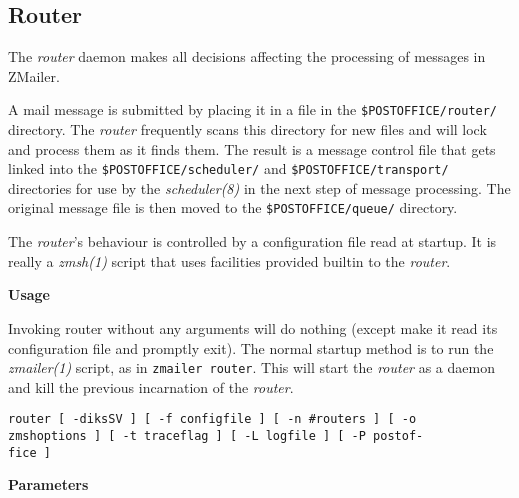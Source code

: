 \subsection{Router}

The {\em router\/} daemon makes all decisions affecting 
the processing of messages in ZMailer.

A mail message is submitted by placing it in a file in the
{\tt \$POSTOFFICE/router/} directory. The 
{\em router\/} frequently scans this directory for new 
files and will lock and process them as it finds them. 
The result is a message control file that gets linked into 
the {\tt \$POSTOFFICE/scheduler/} and 
{\tt \$POSTOFFICE/transport/} directories for use 
by the {\em scheduler(8)\/} in the next step of message 
processing. The original message file is then moved to the 
{\tt \$POSTOFFICE/queue/} directory. 

The {\em router\/}'s behaviour is controlled by a 
configuration file read at startup. It is really a 
{\em zmsh(1)\/} script that uses facilities provided 
builtin to the {\em router\/}. 

{\bf Usage}

Invoking router without any arguments will do nothing
(except make it read its configuration file and promptly
exit). The normal startup method is to run the {\em zmailer(1)\/} 
script, as in {\tt zmailer router}. This will start the 
{\em router\/} as a daemon and  kill the previous 
incarnation of the {\em router\/}. 

\begin{tscreen}
\begin{verbatim}
router [ -diksSV ] [ -f configfile ] [ -n #routers ] [ -o 
zmshoptions ] [ -t traceflag ] [ -L logfile ] [ -P postof-
fice ] 
\end{verbatim}
\end{tscreen}
 

{\bf Parameters}

